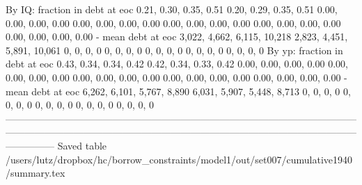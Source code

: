         By IQ: fraction in debt at eoc       0.21, 0.30, 0.35, 0.51       0.20, 0.29, 0.35, 0.51   0.00, 0.00, 0.00, 0.00    0.00, 0.00, 0.00, 0.00      0.00, 0.00, 0.00, 0.00      0.00, 0.00, 0.00, 0.00      0.00, 0.00, 0.00, 0.00
                    - mean debt at eoc  3,022, 4,662, 6,115, 10,218  2,823, 4,451, 5,891, 10,061               0, 0, 0, 0                0, 0, 0, 0                  0, 0, 0, 0                  0, 0, 0, 0                  0, 0, 0, 0
        By yp: fraction in debt at eoc       0.43, 0.34, 0.34, 0.42       0.42, 0.34, 0.33, 0.42   0.00, 0.00, 0.00, 0.00    0.00, 0.00, 0.00, 0.00      0.00, 0.00, 0.00, 0.00      0.00, 0.00, 0.00, 0.00      0.00, 0.00, 0.00, 0.00
                    - mean debt at eoc   6,262, 6,101, 5,767, 8,890   6,031, 5,907, 5,448, 8,713               0, 0, 0, 0                0, 0, 0, 0                  0, 0, 0, 0                  0, 0, 0, 0                  0, 0, 0, 0
---------------------------------------------------------------------------------------------------------------------------------------------------------------------------------------------------------------------------------------
Saved table  /users/lutz/dropbox/hc/borrow_constraints/model1/out/set007/cumulative1940/summary.tex 
